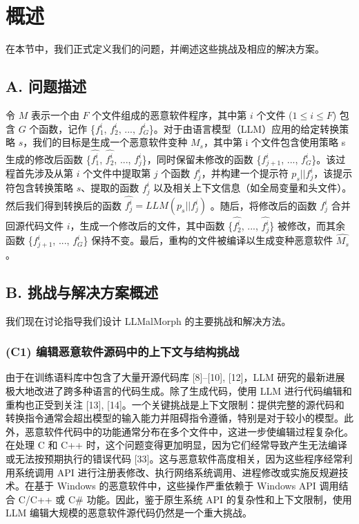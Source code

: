 \chapter{概述}
在本节中，我们正式定义我们的问题，并阐述这些挑战及相应的解决方案。

\section{A. 问题描述}
令 $M$ 表示一个由 $F$ 个文件组成的恶意软件程序，其中第 $i$ 个文件 ($1 ≤ i ≤ F$) 包含 $G$ 个函数，记作 \{$f_{1}^{i}$, $f_{2}^{i}$, ..., $f_{G}^{i}$\}。对于由语言模型（LLM）应用的给定转换策略 $s$，我们的目标是生成一个恶意软件变种 $M_{s}$，其中第 i 个文件包含使用策略 s 生成的修改后函数 \{$\hat{f_{1}^{i}}$, $\hat{f_{2}^{i}}$, ..., $\hat{f_{j}^{i}}$\}，同时保留未修改的函数 \{$f_{j+1}^{i}$, ..., $f_{G}^{i}$\}。该过程首先涉及从第 $i$ 个文件中提取第 $j$ 个函数 $f_{j}^{i}$，并构建一个提示符 $p_{s}||f_{j}^{i}$，该提示符包含转换策略 $s$、提取的函数 $f_{j}^{i}$ 以及相关上下文信息（如全局变量和头文件）。然后我们得到转换后的函数 $\hat{f_{j}^{i}} = LLM(p_{s}||f_{j}^{i})$ 。随后，将修改后的函数 $f_{j}^{i}$ 合并回源代码文件 $i$，生成一个修改后的文件，其中函数 \{$\hat{f_{2}^{i}}$, ..., $\hat{f_{j}^{i}}$\} 被修改，而其余函数 \{$f_{j+1}^{i}$, ..., $f_{G}^{i}$\} 保持不变。最后，重构的文件被编译以生成变种恶意软件 $\hat{M_{s}}$。

\section{B. 挑战与解决方案概述}
我们现在讨论指导我们设计 LLMalMorph 的主要挑战和解决方法。

\subsection{(C1) 编辑恶意软件源码中的上下文与结构挑战}
由于在训练语料库中包含了大量开源代码库 [8]–[10], [12]，LLM 研究的最新进展极大地改进了跨多种语言的代码生成。除了生成代码，使用 LLM 进行代码编辑和重构也正受到关注 [13], [14]。一个关键挑战是上下文限制：提供完整的源代码和转换指令通常会超出模型的输入能力并阻碍指令遵循，特别是对于较小的模型。此外，恶意软件代码中的功能通常分布在多个文件中，这进一步使编辑过程复杂化。在处理 C 和 C++ 时，这个问题变得更加明显，因为它们经常导致产生无法编译或无法按预期执行的错误代码 [33]。这与恶意软件高度相关，因为这些程序经常利用系统调用 API 进行注册表修改、执行网络系统调用、进程修改或实施反规避技术。在基于 Windows 的恶意软件中，这些操作严重依赖于 Windows API 调用结合 C/C++ 或 C\# 功能。因此，鉴于原生系统 API 的复杂性和上下文限制，使用 LLM 编辑大规模的恶意软件源代码仍然是一个重大挑战。

